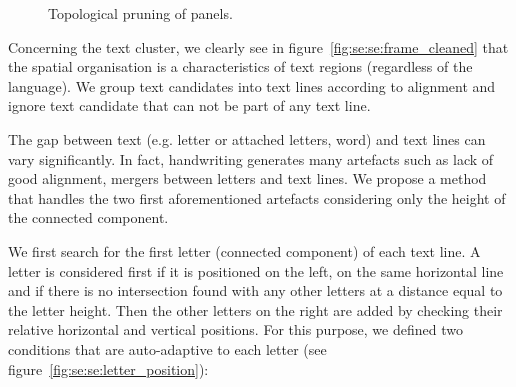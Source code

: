	\begin{figure}	%
	  \centering
			\hspace{2em}
		  \caption{Topological pruning of panels.}
	\end{figure}

Concerning the text cluster, we clearly see in figure~\ref{fig:se:se:frame_cleaned} that the spatial organisation is a characteristics of text regions (regardless of the language).
We group text candidates into text lines according to alignment and ignore text candidate that can not be part of any text line.

The gap between text (e.g. letter or attached letters, word) and text lines can vary significantly.
In fact, handwriting generates many artefacts such as lack of good alignment, mergers between letters and text lines.
We propose a method that handles the two first aforementioned artefacts considering only the height of the connected component.

We first search for the first letter (connected component) of each text line.
A letter is considered first if it is positioned on the left, on the same horizontal line and if there is no intersection found with any other letters at a distance equal to the letter height.
Then the other letters on the right are added by checking their relative horizontal and vertical positions.
For this purpose, we defined two conditions that are auto-adaptive to each letter (see figure~\ref{fig:se:se:letter_position}):

